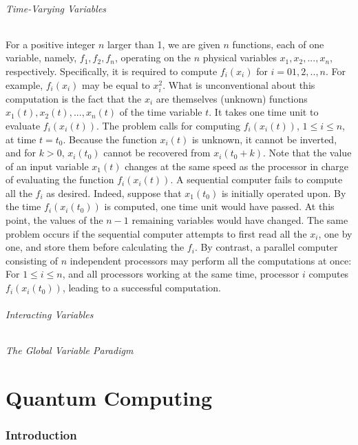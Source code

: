 \documentclass[12pt,a4paper]{report}
\begin{document}
\paragraph{Time-Varying Variables}
For a positive integer $n$ larger than 1, we are given $n$ functions, each of one variable, namely, $f_1, f_2, f_n$, operating on the $n$ physical variables $x_1, x_2, ..., x_n$, respectively. Specifically, it is required to compute $f_i(x_i)$ for $i = 0 1, 2, .., n$. For example, $f_i(x_i)$ may be equal to $x_i^2$. What is unconventional about this computation is the fact that the $x_i$ are themselves (unknown) functions $x_1(t), x_2(t), ..., x_n(t)$ of the time variable $t$. It takes one time unit to evaluate $f_i(x_i(t))$. The problem calls for computing $f_i(x_i(t))$, $1 \leq i \leq n$, at time $t = t_0$. Because the function $x_i(t)$ is unknown, it cannot be inverted, and for $k > 0$, $x_i(t_0)$ cannot be recovered from $x_i(t_0 + k)$. Note that the value of an input variable $x_1(t)$ changes at the same speed as the processor in charge of evaluating the function $f_i(x_i(t))$.
A sequential computer fails to compute all the $f_i$ as desired. Indeed, suppose that $x_1(t_0)$ is initially operated upon. By the time $f_i(x_i(t_0))$ is computed, one time unit would have passed. At this point, the values of the $n - 1$ remaining variables would have changed. The same problem occurs if the sequential computer attempts to first read all the $x_i$, one by one, and store them before calculating the $f_i$.
By contrast, a parallel computer consisting of $n$ independent processors may perform all the computations at once: For $1 \leq i \leq n$, and all processors working at the same time, processor $i$ computes $f_i(x_i(t_0))$, leading to a successful computation.

\paragraph{Interacting Variables}

\paragraph{The Global Variable Paradigm}

\part{Quantum Computing}

\section{Introduction}
\end{document}
